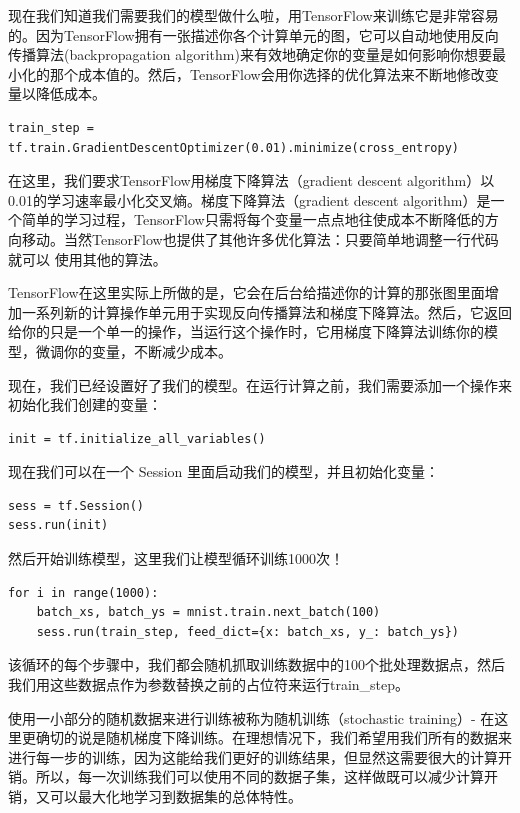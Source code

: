 \documentclass[a4paper,11pt,twoside]{ctexbook}
\begin{document}
现在我们知道我们需要我们的模型做什么啦，用TensorFlow来训练它是非常容易的。因为TensorFlow拥有一张描述你各个计算单元的图，它可以自动地使用反向传播算法(backpropagation algorithm)来有效地确定你的变量是如何影响你想要最小化的那个成本值的。然后，TensorFlow会用你选择的优化算法来不断地修改变量以降低成本。

\begin{lstlisting}
train_step = tf.train.GradientDescentOptimizer(0.01).minimize(cross_entropy)
\end{lstlisting}

在这里，我们要求TensorFlow用梯度下降算法（gradient descent algorithm）以0.01的学习速率最小化交叉熵。梯度下降算法（gradient descent algorithm）是一个简单的学习过程，TensorFlow只需将每个变量一点点地往使成本不断降低的方向移动。当然TensorFlow也提供了其他许多优化算法：只要简单地调整一行代码就可以
使用其他的算法。

TensorFlow在这里实际上所做的是，它会在后台给描述你的计算的那张图里面增加一系列新的计算操作单元用于实现反向传播算法和梯度下降算法。然后，它返回给你的只是一个单一的操作，当运行这个操作时，它用梯度下降算法训练你的模型，微调你的变量，不断减少成本。

现在，我们已经设置好了我们的模型。在运行计算之前，我们需要添加一个操作来初始化我们创建的变量：

\begin{lstlisting}
init = tf.initialize_all_variables()
\end{lstlisting}

现在我们可以在一个 Session 里面启动我们的模型，并且初始化变量：
\begin{lstlisting}
sess = tf.Session()
sess.run(init)
\end{lstlisting}

然后开始训练模型，这里我们让模型循环训练1000次！
\begin{lstlisting}
for i in range(1000):
    batch_xs, batch_ys = mnist.train.next_batch(100)
    sess.run(train_step, feed_dict={x: batch_xs, y_: batch_ys})
\end{lstlisting}

该循环的每个步骤中，我们都会随机抓取训练数据中的100个批处理数据点，然后我们用这些数据点作为参数替换之前的占位符来运行train\_step。

使用一小部分的随机数据来进行训练被称为随机训练（stochastic training）- 在这里更确切的说是随机梯度下降训练。在理想情况下，我们希望用我们所有的数据来进行每一步的训练，因为这能给我们更好的训练结果，但显然这需要很大的计算开销。所以，每一次训练我们可以使用不同的数据子集，这样做既可以减少计算开销，又可以最大化地学习到数据集的总体特性。
\end{document}
